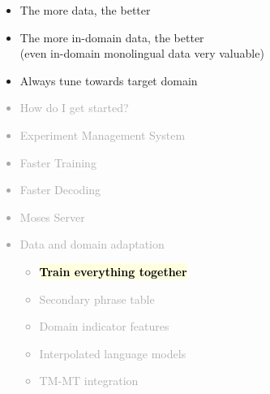 \documentclass[landscape]{uedslides2C}
\newcommand{\currenttopic}[1]{\colorbox{lightyellow}{\textcolor{black}{\bf #1}}}
\begin{document}
\vspace{10mm}
\begin{itemize}
\item The more data, the better
\item The more in-domain data, the better\\
(even in-domain monolingual data very valuable)
\item Always tune towards target domain
\end{itemize}


\vspace{-5mm}
\textcolor{darkgrey}{
\begin{itemize} \itemsep -1mm
\item {How do I get started?}
\item {Experiment Management System}
\item {Faster Training}
\item {Faster Decoding}
\item {Moses Server}
\item {Data and domain adaptation}
  \begin{itemize}\vspace{-5mm}
  \item \currenttopic{Train everything together}
  \item Secondary phrase table
\item Domain indicator features
\item Interpolated language models
  \item TM-MT integration
  \end{itemize}
\end{itemize}
}

\end{document}
